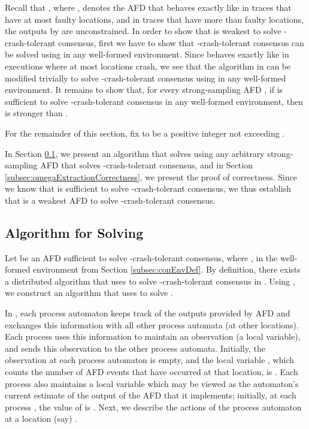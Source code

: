 \documentclass[11pt]{article}
\numberwithin{theorem}{section}
\begin{document}
Recall that , where , denotes the AFD that
behaves exactly like  in traces that have at most  faulty
locations, and in traces that have more than  faulty locations, the outputs by  are unconstrained.
In order to show that  is weakest to solve
-crash-tolerant consensus, first we have to show that
-crash-tolerant consensus can be solved using  in any
well-formed environment. Since  behaves exactly like
 in executions where at most  locations crash, we see that
the algorithm in \cite{chan:ufdfr} can be modified trivially to solve
-crash-tolerant consensus using  in any well-formed
environment. It remains to show that, for every strong-sampling AFD
, if  is sufficient to solve -crash-tolerant consensus in
any well-formed environment,  then  is stronger than . 

For the remainder of this section, fix  to be a positive integer not exceeding .

In Section \ref{subsec:omegaExtraction}, we present an algorithm that
solves  using any arbitrary strong-sampling AFD that solves
-crash-tolerant consensus, and in Section
\ref{subsec:omegaExtractionCorrectness}, we present the proof of
correctness. Since we know that  is sufficient to solve
-crash-tolerant consensus, we thus establish that  is a
weakest AFD to solve -crash-tolerant consensus.

\subsection{Algorithm for Solving }\label{subsec:omegaExtraction}

Let  be an AFD sufficient to solve -crash-tolerant consensus,
where , in the well-formed environment 
from Section \ref{subsec:conEnvDef}. By definition, there exists a
distributed algorithm  that uses  to solve
-crash-tolerant consensus in . Using , we
construct an algorithm  that uses  to solve
. 


In , each process automaton keeps track of the outputs
provided by AFD  and exchanges this information with all other
process automata (at other locations).
Each process uses this information to maintain an observation  (a local variable), and sends this observation to the other process automata. Initially, the observation 
at each process automaton is empty, and the local variable , which
counts the number of AFD events that have occurred at that location,
is . Each process also maintains a local variable  which may be viewed as the automaton's current estimate of the output of the AFD  that it implements; initially, at each process , the value of  is . Next, we describe the actions of the process automaton at a location
(say) . 
\end{document}
